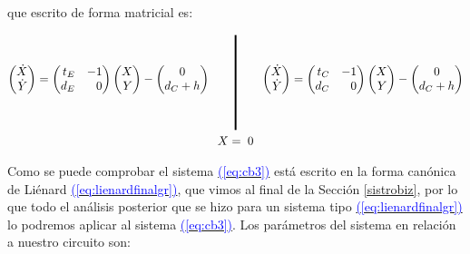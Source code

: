 \documentclass[12pt,a4paper]{report} %
\newcommand{\eref}[1]{\hyperref[#1]{\textcolor{blue}{(\ref*{#1})}}}
\begin{document}
	\vspace{0.5cm}\noindent que escrito de forma matricial es:
	
	\begin{equation}
		\label{eq:cb3}
		\begin{gathered}
			\begin{pmatrix*}[r]
				\dot{X}\\ \dot{Y}
			\end{pmatrix*}= \begin{pmatrix*}[r]
				t_E & -1 \\ d_E & 0
			\end{pmatrix*} \begin{pmatrix*}[r]
				X \\ Y
			\end{pmatrix*}-\begin{pmatrix*}[c]
				0 \\ d_C+h
			\end{pmatrix*} \qquad 
			\rule[-40pt]{1.5pt}{80pt} \qquad 
				\begin{pmatrix*}[r]
				\dot{X}\\ \dot{Y}
			\end{pmatrix*}= \begin{pmatrix*}[r]
				t_C & -1 \\ d_C & 0
			\end{pmatrix*} \begin{pmatrix*}[r]
				X \\ Y
			\end{pmatrix*}-\begin{pmatrix*}[c]
				0 \\ d_C+h
			\end{pmatrix*} \\ X=\;0
		\end{gathered}
	\end{equation}\smallskip
	
	\newpage
	
	\vspace{0.5cm} \noindent Como se puede comprobar el sistema \eref{eq:cb3} está escrito en la forma canónica de Liénard \eref{eq:lienardfinalgr}, que vimos al final de la Sección \ref{sistrobiz}, por lo que todo el análisis posterior que se hizo para un sistema tipo \eref{eq:lienardfinalgr} lo podremos aplicar al sistema \eref{eq:cb3}. Los parámetros del sistema en relación a nuestro circuito son:
	
\end{document}
